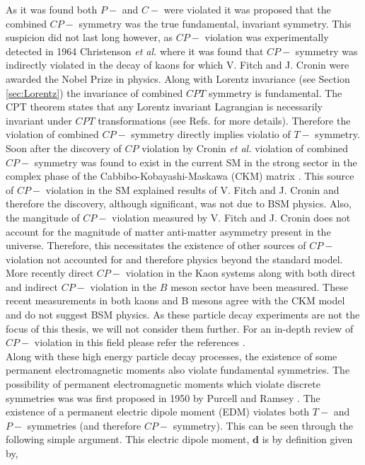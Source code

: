 \documentclass[10pt,a4paper, twoside, openright]{report}
\begin{document}
As it was found both $P-$ and $C-$ were violated it was proposed that the combined $CP-$ symmetry was the true fundamental, invariant symmetry. This suspicion did not last long however, as  $CP-$ violation was experimentally detected in 1964 Christenson \textit{et al.} \cite{Christenson1964} where it was found that $CP-$ symmetry was indirectly violated in the decay of kaons for which V. Fitch and J. Cronin  were awarded the Nobel Prize in physics. Along with Lorentz invariance (see Section \ref{sec:Lorentz}) the invariance of combined $CPT$ symmetry is fundamental. The CPT theorem states that any Lorentz invariant Lagrangian is necessarily invariant under $CPT$ transformations (see Refs. \cite{LandauVol4, KhriplovichCP, HenleyCP} for more details). Therefore the violation of combined $CP-$ symmetry directly implies violatio of $T-$ symmetry.  Soon after the discovery of $CP$ violation by Cronin \textit{et al.} violation of combined $CP-$ symmetry was found to exist in the current SM in the strong sector in the complex phase of the Cabbibo-Kobayashi-Maskawa (CKM) matrix \cite{Cabibbo1963, KM1973}. This source of $CP-$ violation in the SM explained results of V. Fitch and J. Cronin and therefore the discovery, although significant, was not due to BSM physics. Also, the mangitude of  $CP-$ violation measured by V. Fitch and J. Cronin does not account for the magnitude of matter anti-matter asymmetry present in the universe. Therefore, this necessitates the existence of other sources of $CP-$ violation not accounted for and therefore physics beyond the standard model. More recently direct $CP-$ violation in the Kaon systems \cite{Alavi1999, Fanti1999} along with both direct and indirect $CP-$ violation in the $B$ meson sector \cite{Belle2001, Aaij2013, Aubert2003} have been measured. These recent measurements in both kaons and B mesons agree with the CKM model and do not suggest BSM physics.  As these particle decay experiments are not the focus of this thesis, we will not  consider them further. For an in-depth review of $CP-$ violation in this field please refer the references \cite{}. \\
\linebreak
Along with these high energy particle decay processes, the existence of some permanent electromagnetic moments also violate fundamental symmetries. The possibility of permanent electromagnetic moments which violate  discrete symmetries was was first proposed in 1950 by Purcell and Ramsey  \cite{Purcell1950}. The existence of a permanent electric dipole moment (EDM) violates both $T-$ and $P-$ symmetries (and therefore $CP-$ symmetry)\cite{Landau1957}. This can be seen through the following simple argument. This electric dipole moment, $\textbf{d}$ is by definition given by,  
\end{document}
